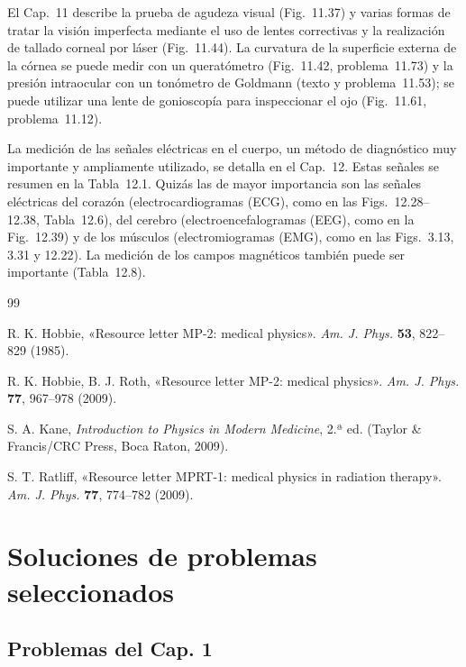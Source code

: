 \documentclass[12pt,a4paper]{book}
\begin{document}
El Cap.~11 describe la prueba de agudeza visual (Fig.~11.37) y varias formas de tratar la visión imperfecta mediante el uso de lentes correctivas y la realización de tallado corneal por láser (Fig.~11.44). La curvatura de la superficie externa de la córnea se puede medir con un queratómetro (Fig.~11.42, problema~11.73) y la presión intraocular con un tonómetro de Goldmann (texto y problema~11.53); se puede utilizar una lente de gonioscopía para inspeccionar el ojo (Fig.~11.61, problema~11.12).

La medición de las señales eléctricas en el cuerpo, un método de diagnóstico muy importante y ampliamente utilizado, se detalla en el Cap.~12. Estas señales se resumen en la Tabla~12.1. Quizás las de mayor importancia son las señales eléctricas del corazón (electrocardiogramas (ECG), como en las Figs.~12.28--12.38, Tabla~12.6), del cerebro (electroencefalogramas (EEG), como en la Fig.~12.39) y de los músculos (electromiogramas (EMG), como en las Figs.~3.13, 3.31 y 12.22). La medición de los campos magnéticos también puede ser importante (Tabla~12.8).

\begin{thebibliography}{99}

 R. K. Hobbie, «Resource letter MP-2: medical physics». \textit{Am. J. Phys.} \textbf{53}, 822--829 (1985).

 R. K. Hobbie, B. J. Roth, «Resource letter MP-2: medical physics». \textit{Am. J. Phys.} \textbf{77}, 967--978 (2009).

 S. A. Kane, \textit{Introduction to Physics in Modern Medicine}, 2.ª ed. (Taylor \& Francis/CRC Press, Boca Raton, 2009).

 S. T. Ratliff, «Resource letter MPRT-1: medical physics in radiation therapy». \textit{Am. J. Phys.} \textbf{77}, 774--782 (2009).

\end{thebibliography}


\chapter*{Soluciones de problemas seleccionados}

\section*{Problemas del Cap. 1}
\end{document}
